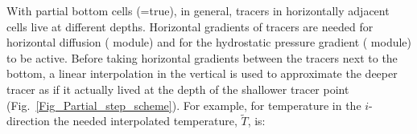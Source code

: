 
With partial bottom cells (=true), in general, tracers in horizontally 
adjacent cells live at different depths. Horizontal gradients of tracers are needed 
for horizontal diffusion ( module) and for the hydrostatic pressure 
gradient ( module) to be active. 
Before taking horizontal gradients between the tracers next to the bottom, a linear 
interpolation in the vertical is used to approximate the deeper tracer as if it actually 
lived at the depth of the shallower tracer point (Fig.~\ref{Fig_Partial_step_scheme}). 
For example, for temperature in the $i$-direction the needed interpolated 
temperature, $\widetilde{T}$, is:


